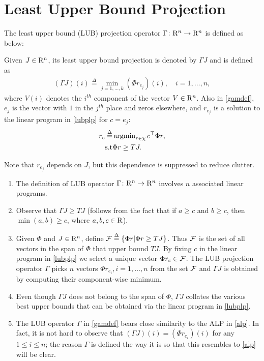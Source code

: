 \section{Least Upper Bound Projection}\label{sec:lubp}
The least upper bound (LUB) projection operator $\Gamma \colon \mathrm{R}^n \rightarrow\mathrm{R}^n$ is defined as below:
\begin{definition}\label{lubpop}
Given $J\in \mathrm{R}^n$, its least upper bound projection is denoted by $\Gamma J$ and is defined as 
\begin{align}\label{gamdef}
(\Gamma J)(i)\stackrel{\Delta}{=}\underset{j=1,\ldots,k}{\min} (\Phi r_{e_j})(i),\quad i=1,\ldots,n,
\end{align}
where $V(i)$ denotes the $i^{th}$ component of the vector $V\in \mathrm{R}^n$. Also in \eqref{gamdef}, $e_j$ is the vector with $1$ in the $j^{th}$ place and zeros elsewhere, and $r_{e_j}$ is a solution to the linear program in \eqref{lubplp} for $c=e_j$:
\begin{align}\label{lubplp}
 r_c   \stackrel{\Delta}{=}& \argmin_{r\in \chi} c^\top \Phi r,\nn\\
 \text{s.t}& \mb \Phi r\geq  TJ.
\end{align}
\end{definition}
Note that $r_{e_j}$ depends on $J$, but this dependence is suppressed to reduce clutter. 
\begin{remark}
\begin{enumerate}
\item The definition of LUB operator $\Gamma \colon \mathrm{R}^n \rightarrow \mathrm{R}^n$ involves $n$ associated linear programs.
\item Observe that $\Gamma J\geq TJ$ (follows from the fact that if $a\geq c$ and $b\geq c$, then $\min(a,b)\geq c$, where $a, b, c \in \mathrm{R}$).
\item Given $\Phi$ and $J\in \mathrm{R}^n$, define $\mathcal{F}\stackrel{\Delta}{=}\{\Phi r|\Phi r\geq TJ\}$. Thus $\mathcal{F}$ is the set of all vectors in the span of $\Phi$ that upper bound $TJ$. By fixing $c$ in the linear program in \eqref{lubplp} we select a unique vector $\Phi r_c \in \mathcal{F}$. The LUB projection operator $\Gamma$ picks $n$ vectors $\Phi r_{e_i},i=1,\ldots,n$ from the set $\mathcal{F}$ and $\Gamma J$ is obtained by computing their component-wise minimum.
\item Even though $\Gamma J$ does not belong to the span of $\Phi$, $\Gamma J$ collates the various best upper bounds that can be obtained via the linear program in \eqref{lubplp}.
\item The LUB operator $\Gamma$ in \eqref{gamdef} bears close similarity to the ALP in \eqref{alp}.
In fact, it is not hard to observe that $(\Gamma J)(i) = (\Phi r_{e_i})(i)$ for any $1\le i \le n$; the reason $\Gamma$ is defined the way it is so that this resembles to \eqref{alp} will be clear. 
\end{enumerate}
\end{remark}
